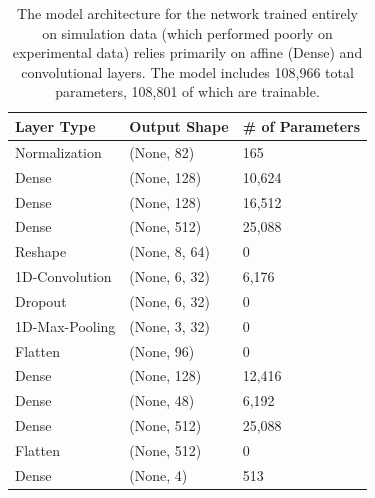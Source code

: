 \bgroup
\def\arraystretch{1.5}%
\begin{table}[h!]
    \centering
    \begin{tabular}{|l|l|l|}
    \hline
    \textbf{Layer  Type }   & \textbf{ Output Shape}  & \textbf{\# of Parameters} \\ \hline
    Normalization  & (None, 82)    & 165                  \\ \hline
    Dense          & (None, 128)   & 10,624               \\ \hline
    Dense          & (None, 128)   & 16,512               \\ \hline
    Dense          & (None, 512)   & 25,088               \\ \hline
    Reshape        & (None, 8, 64) & 0                    \\ \hline
    1D-Convolution & (None, 6, 32) & 6,176                \\ \hline
    Dropout        & (None, 6, 32) & 0                    \\ \hline
    1D-Max-Pooling & (None, 3, 32) & 0                    \\ \hline
    Flatten        & (None, 96)    & 0                    \\ \hline
    Dense          & (None, 128)   & 12,416               \\ \hline
    Dense          & (None, 48)    & 6,192                \\ \hline
    Dense          & (None, 512)   & 25,088               \\ \hline
    Flatten        & (None, 512)   & 0                    \\ \hline
    Dense          & (None, 4)     & 513                  \\ \hline
    \end{tabular}
    \caption[NN-Architecture Optimized for Simulations]{The model architecture for the network trained entirely on simulation data (which performed poorly on experimental data) relies primarily on affine (Dense) and convolutional layers. The model includes 108,966 total parameters, 108,801 of which are trainable.}
    \label{tb:nn-arch-sims}
\end{table}
\egroup


